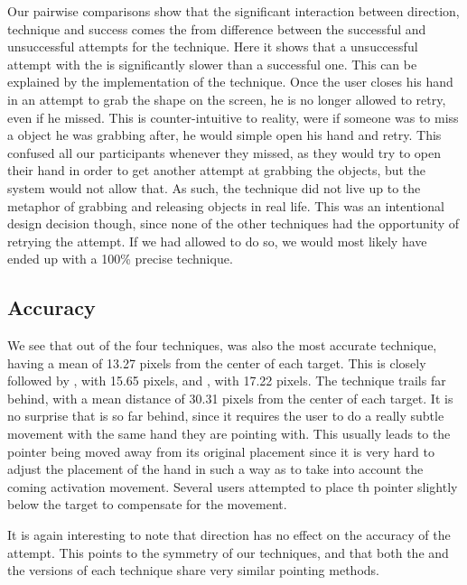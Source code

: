 Our pairwise comparisons show that the significant interaction between direction, technique and success comes the from difference between the successful and unsuccessful attempts for the \grab \pull technique. 
Here it shows that a unsuccessful attempt with the \grab \pull is significantly slower than a successful one. 
This can be explained by the implementation of the technique. 
Once the user closes his hand in an attempt to grab the shape on the screen, he is no longer allowed to retry, even if he missed.
This is counter-intuitive to reality, were if someone was to miss a object he was grabbing after, he would simple open his hand and retry.
This confused all our participants whenever they missed, as they would try to open their hand in order to get another attempt at grabbing the objects, but the system would not allow that.
As such, the \grab \pull technique did not live up to the metaphor of grabbing and releasing objects in real life.
This was an intentional design decision though, since none of the other techniques had the opportunity  of retrying the attempt.
If we had allowed \grab \pull to do so, we would most likely have ended up with a 100\% precise technique. 

\subsection{Accuracy}
We see that out of the four techniques, \swipe was also the most accurate technique, having a mean of 13.27 pixels from the center of each target. 
This is closely followed by \throw, with 15.65 pixels, and \grab, with 17.22 pixels.
The \tilt technique trails far behind, with a mean distance of 30.31 pixels from the center of each target.   
It is no surprise that \tilt is so far behind, since it requires the user to do a really subtle movement with the same hand they are pointing with.
This usually leads to the pointer being moved away from its original placement since it is very hard to adjust the placement of the hand in such a way as to take into account the coming activation movement. 
Several users attempted to place th pointer slightly below the target to compensate for the movement. 

It is again interesting to note that direction has no effect on the accuracy of the attempt. 
This points to the symmetry of our techniques, and that both the \pull and the \push versions of each technique share very similar pointing methods.

